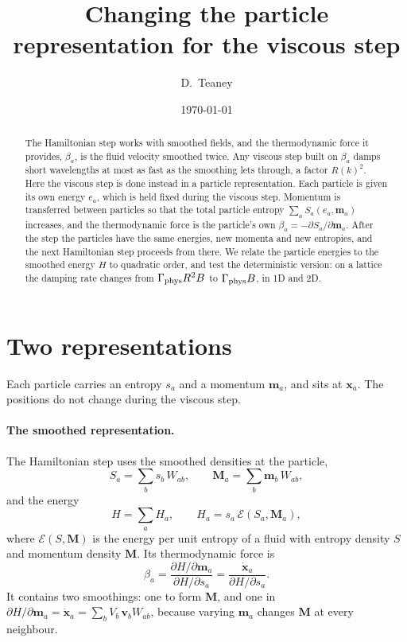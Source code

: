 \documentclass[11pt,aps,preprint,nofootinbib,superscriptaddress,tightenlines]{revtex4-2}
\def\st{\begin{equation}}
\def\stp{\end{equation}}
\let\oldparagraph\paragraph
\renewcommand{\paragraph}{\par\bigskip\oldparagraph}
\begin{document}
\title{Changing the particle representation for the viscous step}
\author{D.~Teaney}
\date{\today}

\begin{abstract}
The Hamiltonian step works with smoothed fields, and the thermodynamic force it
provides, $\beta_a$, is the fluid velocity smoothed twice.  Any viscous step
built on $\beta_a$ damps short wavelengths at most as fast as the smoothing
lets through, a factor $R(k)^2$.  Here the viscous step is done instead in a
particle representation.  Each particle is given its own energy $e_a$, which is
held fixed during the viscous step.  Momentum is transferred between particles
so that the total particle entropy $\sum_aS_a(e_a,\bm m_a)$ increases, and the
thermodynamic force is the particle's own $\beta_a=-\partial S_a/\partial\bm m_a$.
After the step the particles have the same energies, new momenta and new
entropies, and the next Hamiltonian step proceeds from there.  We relate the
particle energies to the smoothed energy $H$ to quadratic order, and test the
deterministic version: on a lattice the damping rate changes from
$\Gamma_{\rm phys}R^2B$ to $\Gamma_{\rm phys}B$, in 1D and 2D.
\end{abstract}

\maketitle

\section{Two representations}
\label{sec:reps}

Each particle carries an entropy $s_a$ and a momentum $\bm m_a$, and sits at
$\bm x_a$.  The positions do not change during the viscous step.

\paragraph{The smoothed representation.}  The Hamiltonian step uses the
smoothed densities at the particle,
\st
S_a=\sum_bs_b\,W_{ab},\qquad \bm M_a=\sum_b\bm m_b\,W_{ab},
\stp
and the energy
\st
H=\sum_aH_a,\qquad H_a=s_a\,\mathcal E(S_a,\bm M_a),
\label{H}
\stp
where $\mathcal E(S,\bm M)$ is the energy per unit entropy of a fluid with
entropy density $S$ and momentum density $\bm M$.  Its thermodynamic force is
\st
\beta_a=\frac{\partial H/\partial\bm m_a}{\partial H/\partial s_a}
=\frac{\dot{\bm x}_a}{\partial H/\partial s_a} .
\stp
It contains two smoothings: one to form $\bm M$, and one in
$\partial H/\partial\bm m_a=\dot{\bm x}_a=\sum_bV_b\,\bm v_bW_{ab}$, because
varying $\bm m_a$ changes $\bm M$ at every neighbour.
\end{document}
